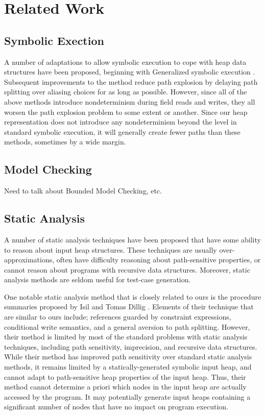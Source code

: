 \section{Related Work}
\label{related}

\subsection{Symbolic Exection}
A number of adaptations to allow symbolic execution to cope with heap data structures have been proposed, beginning with Generalized symbolic execution \cite{GSE03}. Subsequent improvements to the method \cite{Deng:2006,Deng:2007} reduce path explosion by delaying path splitting over aliasing choices for as long as possible. However, since all of the above methods introduce nondeterminism during field reads and writes, they all worsen the path explosion problem to some extent or another. Since our heap representation does not introduce any nondeterminism beyond the level in standard symbolic execution, it will generally create fewer paths than these methods, sometimes by a wide margin.

\subsection{Model Checking}
Need to talk about Bounded Model Checking, etc.

\subsection{Static Analysis}
A number of static analysis techniques have been proposed that have some ability to reason about input heap structures. These techniques are usually over-approximations, often have difficulty reasoning about path-sensitive properties, or cannot reason about programs with recursive data structures. Moreover, static analysis methods are seldom useful for test-case generation.

One notable static analysis method that is closely related to ours is the procedure summaries proposed by Isil and Tomas Dillig \cite{Dillig:2011}. Elements of their technique that are similar to ours include; references guarded by constraint expressions, conditional write semantics, and a general aversion to path splitting. However, their method is limited by most of the standard problems with static analysis techniques, including path sensitivity, imprecision, and recursive data structures. While their method has improved path sensitivity over standard static analysis methods, it remains limited by a statically-generated symbolic input heap, and cannot adapt to path-sensitive heap properties of the input heap. Thus, their method cannot determine a priori which nodes in the input heap are actually accessed by the program. It may potentially generate input heaps containing a significant number of nodes that have no impact on program execution.

